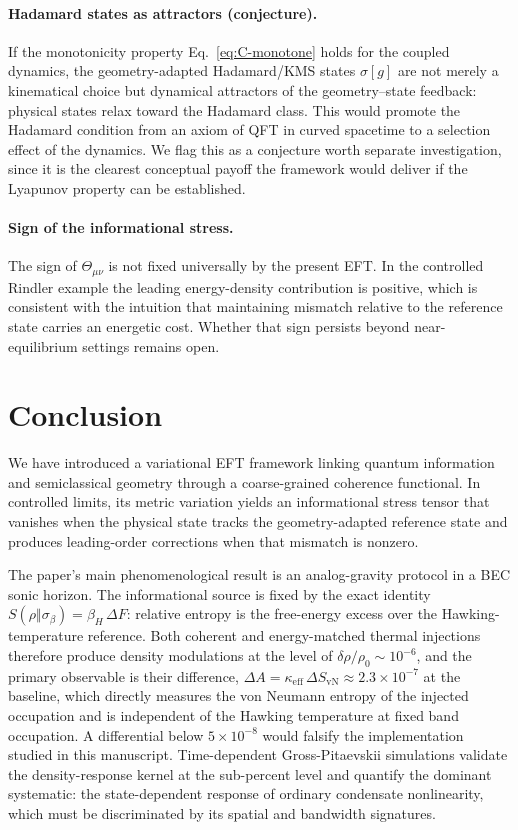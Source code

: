 \documentclass[aps,prd,twocolumn,superscriptaddress,nofootinbib,floatfix]{revtex4-2}
\begin{document}
\paragraph{Hadamard states as attractors (conjecture).}
If the monotonicity property Eq.~\eqref{eq:C-monotone} holds for the coupled dynamics, the geometry-adapted Hadamard/KMS states $\sigma[g]$ are not merely a kinematical choice but dynamical attractors of the geometry--state feedback: physical states relax toward the Hadamard class. This would promote the Hadamard condition from an axiom of QFT in curved spacetime to a selection effect of the dynamics. We flag this as a conjecture worth separate investigation, since it is the clearest conceptual payoff the framework would deliver if the Lyapunov property can be established.

\paragraph{Sign of the informational stress.}
The sign of $\Theta_{\mu\nu}$ is not fixed universally by the present EFT. In the controlled Rindler example the leading energy-density contribution is positive, which is consistent with the intuition that maintaining mismatch relative to the reference state carries an energetic cost. Whether that sign persists beyond near-equilibrium settings remains open.


\section{Conclusion}
\label{sec:conclusion}

We have introduced a variational EFT framework linking quantum information and semiclassical geometry through a coarse-grained coherence functional. In controlled limits, its metric variation yields an informational stress tensor that vanishes when the physical state tracks the geometry-adapted reference state and produces leading-order corrections when that mismatch is nonzero.

The paper's main phenomenological result is an analog-gravity protocol in a BEC sonic horizon. The informational source is fixed by the exact identity $S(\rho\Vert\sigma_\beta) = \beta_H\,\Delta F$: relative entropy is the free-energy excess over the Hawking-temperature reference. Both coherent and energy-matched thermal injections therefore produce density modulations at the level of $\delta\rho/\rho_0 \sim 10^{-6}$, and the primary observable is their difference, $\Delta A = \kappa_{\mathrm{eff}}\,\Delta S_{\mathrm{vN}} \approx 2.3\times10^{-7}$ at the baseline, which directly measures the von Neumann entropy of the injected occupation and is independent of the Hawking temperature at fixed band occupation. A differential below $5\times10^{-8}$ would falsify the implementation studied in this manuscript. Time-dependent Gross-Pitaevskii simulations validate the density-response kernel at the sub-percent level and quantify the dominant systematic: the state-dependent response of ordinary condensate nonlinearity, which must be discriminated by its spatial and bandwidth signatures.
\end{document}
